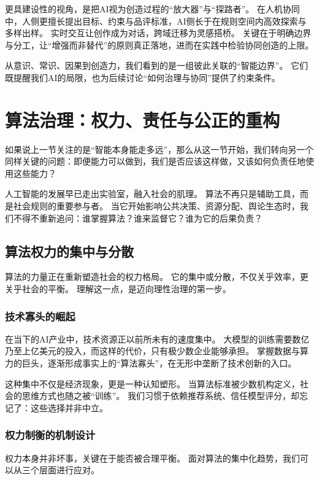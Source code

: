 更具建设性的视角，是把AI视为创造过程的“放大器”与“探路者”。
在人机协同中，人侧更擅长提出目标、约束与品评标准，AI侧长于在规则空间内高效探索与多样出样。
实时交互让创作成为对话，跨域迁移为灵感搭桥。
关键在于明确边界与分工，让“增强而非替代”的原则真正落地，进而在实践中检验协同创造的上限。

从意识、常识、因果到创造力，我们看到的是一组彼此关联的“智能边界”。
它们既提醒我们AI的局限，也为后续讨论“如何治理与协同”提供了约束条件。

\section{算法治理：权力、责任与公正的重构}

如果说上一节关注的是“智能本身能走多远”，那么从这一节开始，我们转向另一个同样关键的问题：即便能力可以做到，我们是否应该这样做，又该如何负责任地使用这些能力？

人工智能的发展早已走出实验室，融入社会的肌理。
算法不再只是辅助工具，而是社会规则的重要参与者。
当它开始影响公共决策、资源分配、舆论生态时，我们不得不重新追问：谁掌握算法？谁来监督它？谁为它的后果负责？

\subsection{算法权力的集中与分散}

算法的力量正在重新塑造社会的权力格局。
它的集中或分散，不仅关乎效率，更关乎社会的平衡。
理解这一点，是迈向理性治理的第一步。

\subsubsection{技术寡头的崛起}

在当下的AI产业中，技术资源正以前所未有的速度集中。
大模型的训练需要数亿乃至上亿美元的投入，而这样的代价，只有极少数企业能够承担。
掌握数据与算力的巨头，逐渐形成事实上的“算法寡头”，在无形中垄断了技术创新的入口。

这种集中不仅是经济现象，更是一种认知塑形。
当算法标准被少数机构定义，社会的思维方式也随之被“训练”。
我们习惯于依赖推荐系统、信任模型评分，却忘记了：这些选择并非中立。

\subsubsection{权力制衡的机制设计}

权力本身并非坏事，关键在于能否被合理平衡。
面对算法的集中化趋势，我们可以从三个层面进行应对。

